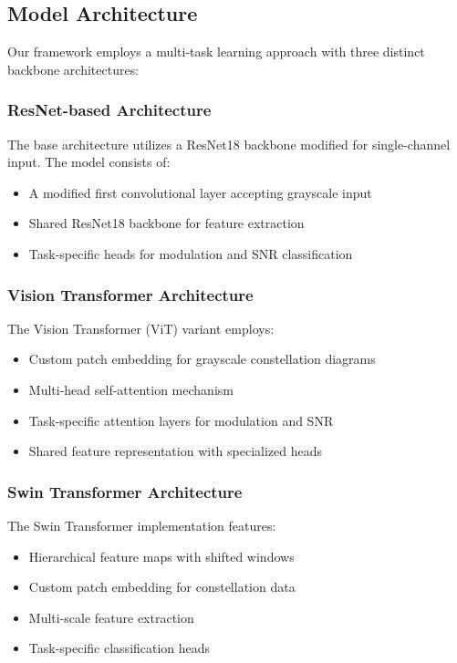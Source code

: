 \documentclass{ELSP}
\begin{document}
\subsection{Model Architecture}
Our framework employs a multi-task learning approach with three distinct backbone architectures:

\subsubsection{ResNet-based Architecture}
The base architecture utilizes a ResNet18 backbone modified for single-channel input. The model consists of:
\begin{itemize}
    \item A modified first convolutional layer accepting grayscale input
    \item Shared ResNet18 backbone for feature extraction
    \item Task-specific heads for modulation and SNR classification
\end{itemize}

\subsubsection{Vision Transformer Architecture}
The Vision Transformer (ViT) variant employs:
\begin{itemize}
    \item Custom patch embedding for grayscale constellation diagrams
    \item Multi-head self-attention mechanism
    \item Task-specific attention layers for modulation and SNR
    \item Shared feature representation with specialized heads
\end{itemize}

\subsubsection{Swin Transformer Architecture}
The Swin Transformer implementation features:
\begin{itemize}
    \item Hierarchical feature maps with shifted windows
    \item Custom patch embedding for constellation data
    \item Multi-scale feature extraction
    \item Task-specific classification heads
\end{itemize}
\end{document}
